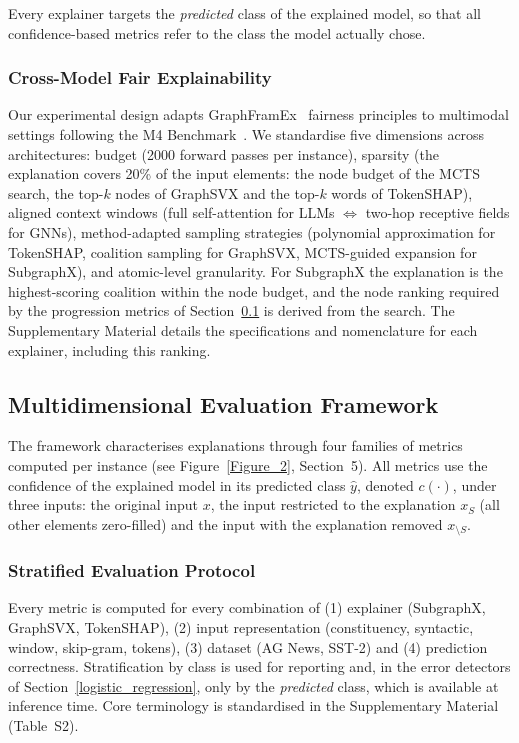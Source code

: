 Every explainer targets the \emph{predicted} class of the explained model, so that all confidence-based metrics refer to the class the model actually chose.

\subsubsection{Cross-Model Fair Explainability} \label{sec:crossfair}

Our experimental design adapts GraphFramEx~\cite{amara2022graphframex} fairness principles to multimodal settings following the M4 Benchmark~\cite{10.5555/3666122.3666203}. We standardise five dimensions across architectures: budget (2000 forward passes per instance), sparsity (the explanation covers 20\% of the input elements: the node budget of the MCTS search, the top-\(k\) nodes of GraphSVX and the top-\(k\) words of TokenSHAP), aligned context windows (full self-attention for LLMs \(\Leftrightarrow\) two-hop receptive fields for GNNs), method-adapted sampling strategies (polynomial approximation for TokenSHAP, coalition sampling for GraphSVX, MCTS-guided expansion for SubgraphX), and atomic-level granularity. For SubgraphX the explanation is the highest-scoring coalition within the node budget, and the node ranking required by the progression metrics of Section~\ref{sec:evaluation_framework} is derived from the search. The Supplementary Material details the specifications and nomenclature for each explainer, including this ranking.

\subsection{Multidimensional Evaluation Framework} \label{sec:evaluation_framework}

The framework characterises explanations through four families of metrics computed per instance (see Figure~\ref{Figure_2}, Section~5). All metrics use the confidence of the explained model in its predicted class \(\hat{y}\), denoted \(c(\cdot)\), under three inputs: the original input \(x\), the input restricted to the explanation \(x_{S}\) (all other elements zero-filled) and the input with the explanation removed \(x_{\setminus S}\).

\subsubsection{Stratified Evaluation Protocol}

Every metric is computed for every combination of (1) explainer (SubgraphX, GraphSVX, TokenSHAP), (2) input representation (constituency, syntactic, window, skip-gram, tokens), (3) dataset (AG News, SST-2) and (4) prediction correctness. Stratification by class is used for reporting and, in the error detectors of Section~\ref{logistic_regression}, only by the \emph{predicted} class, which is available at inference time. Core terminology is standardised in the Supplementary Material (Table~S2).

